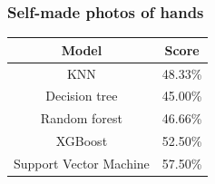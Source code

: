 \documentclass[aspectratio=169]{beamer}
\begin{document}
\begin{frame}
  \frametitle{Self-made photos of hands}

  \begin{table}
    \centering
    \begin{tabular}{|c|c|}
    \hline
      \textbf{Model} & \textbf{Score} \\
      \hline
      KNN & 48.33\% \\
      \hline
      Decision tree & 45.00\% \\
      \hline
      Random forest & 46.66\% \\
      \hline
      XGBoost & 52.50\% \\
      \hline
      Support Vector Machine & 57.50\% \\
      \hline
    \end{tabular}
  \end{table}
  
\end{frame}








  

\end{document}

